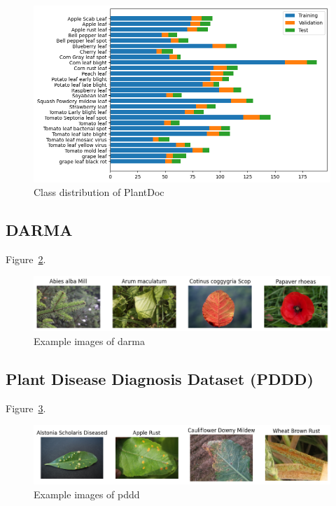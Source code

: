 \begin{figure}[H]
    \begin{center}
    \includegraphics[width=15cm]{../images/class_distribution_of_plantdoc.png}
    \caption{Class distribution of PlantDoc}\label{fig:class_distribution_of_plantdoc}
    \end{center}
\end{figure}

\subsection{DARMA}

Figure~\ref{fig:example_images_of_darma}.

\begin{figure}[H]
    \begin{center}
    \includegraphics[width=15cm]{../images/example_images_of_darma.png}
    \caption{Example images of \gls{darma}}\label{fig:example_images_of_darma}
    \end{center}
\end{figure}

\subsection{Plant Disease Diagnosis Dataset (PDDD)}

Figure~\ref{fig:example_images_of_pddd}.

\begin{figure}[H]
    \begin{center}
    \includegraphics[width=15cm]{../images/example_images_of_pddd.png}
    \caption{Example images of \gls{pddd}}\label{fig:example_images_of_pddd}
    \end{center}
\end{figure}


